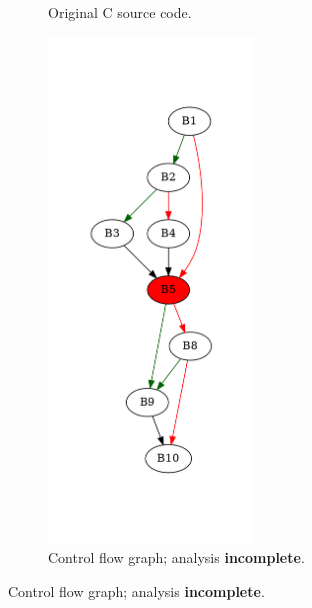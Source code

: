 \begin{figure}[htbp]
	\centering
	\begin{subfigure}[b]{0.30\textwidth}
		\centering
		
		\caption{Original C source code.}
	\end{subfigure}
	\begin{subfigure}[b]{0.50\textwidth}
		\centering
		\includegraphics[width=0.6\textwidth]{inc/appendices/examples/hammock/counter-example/jump-threading-and-short-circuit/jump-threading-and-short-circuit_jump/f_0004b.png}
		\caption{Control flow graph; analysis \textbf{incomplete}.}
	\end{subfigure}
\end{figure}

